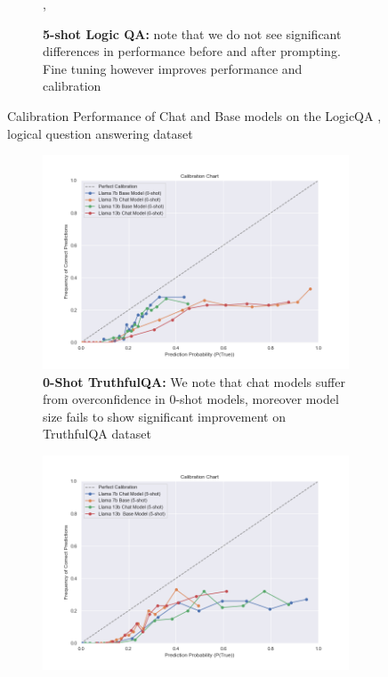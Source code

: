 \documentclass[11pt]{article}
\begin{document}
\begin{figure}
\begin{subfigure}[b]{0.49\textwidth}
         \caption{\textbf{5-shot Logic QA:}  note that we do not see significant differences in performance before and after prompting. Fine tuning however improves performance and calibration},
         \label{fig:0-shot-MMLU}
    \end{subfigure} 
     
     
        \caption{Calibration Performance of Chat and Base models on the LogicQA , logical question answering dataset}
        \label{fig:three graphs}
\end{figure}

\begin{figure}
     \centering
     \begin{subfigure}[b]{0.49\textwidth}
         \centering \includegraphics[width=1.3\textwidth]{figures/0-shot-truthful_qa.png}
         \caption{\textbf{0-Shot TruthfulQA:} We note that chat models suffer from overconfidence in 0-shot models, moreover model size fails to show significant improvement on TruthfulQA dataset}
         \label{fig:0-shot-truthfulqa}
     \end{subfigure}
     \hfill
     \begin{subfigure}[b]{0.49\textwidth}
         \centering
         \includegraphics[width=1.3\textwidth]{figures/5-shot-TruthQA.png}

\end{subfigure}
\end{figure}
\end{document}
